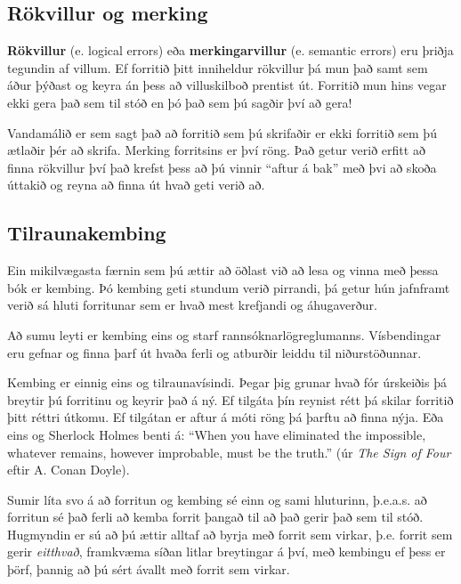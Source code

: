 \subsection{Rökvillur og merking}

{\bf Rökvillur} (e. logical errors) eða {\bf merkingarvillur} (e. semantic errors) eru þriðja tegundin af villum.
Ef forritið þitt inniheldur rökvillur þá mun það samt sem áður þýðast og keyra án þess að villuskilboð prentist út.
Forritið mun hins vegar ekki gera það sem til stóð en þó það sem þú sagðir því að gera!

Vandamálið er sem sagt það að forritið sem þú skrifaðir er ekki forritið sem þú ætlaðir þér að skrifa.
Merking forritsins er því röng.
Það getur verið erfitt að finna rökvillur því það krefst þess að þú vinnir ``aftur á bak'' með þvi að skoða úttakið og reyna að finna út hvað geti verið að.

\subsection{Tilraunakembing}

Ein mikilvægasta færnin sem þú ættir að öðlast við að lesa og vinna með þessa bók er kembing.
Þó kembing geti stundum verið pirrandi, þá getur hún jafnframt verið sá hluti forritunar sem er hvað mest krefjandi og áhugaverður.

Að sumu leyti er kembing eins og starf rannsóknarlögreglumanns.
Vísbendingar eru gefnar og finna þarf út hvaða ferli og atburðir leiddu til niðurstöðunnar. 

Kembing er einnig eins og tilraunavísindi.
Þegar þig grunar hvað fór úrskeiðis þá breytir þú forritinu og keyrir það á ný.
Ef tilgáta þín reynist rétt þá skilar forritið þitt réttri útkomu.
Ef tilgátan er aftur á móti röng þá þarftu að finna nýja.
Eða eins og Sherlock Holmes benti á: ``When you have eliminated the
impossible, whatever remains, however improbable, must be the truth.''
(úr {\em The Sign of Four} eftir A. Conan Doyle).


Sumir líta svo á að forritun og kembing sé einn og sami hluturinn, þ.e.a.s. að forritun sé það ferli að kemba forrit þangað til að það gerir það sem til stóð.
Hugmyndin er sú að þú ættir alltaf að byrja með forrit sem virkar, þ.e. forrit sem gerir {\em eitthvað}, framkvæma síðan litlar breytingar á því, með kembingu ef þess er þörf, þannig að þú sért ávallt með forrit sem virkar.

